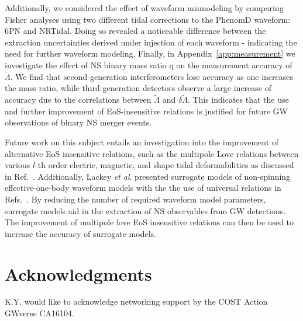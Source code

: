 \documentclass[prd,twocolumn,nofootinbib,superscriptaddress,amsmath,amssymb]{revtex4-1}
\begin{document}
Additionally, we considered the effect of waveform mismodeling by comparing Fisher analyses using two different tidal corrections to the PhenomD waveform: 6PN and NRTidal.
Doing so revealed a noticeable difference between the extraction uncertainties derived under injection of each waveform - indicating the need for further waveform modeling.
Finally, in Appendix~\ref{app:measurement} we investigate the effect of NS binary mass ratio q on the measurement accuracy of $\tilde\Lambda$.
We find that second generation interferometers lose accuracy as one increases the mass ratio, while third generation detectors observe a large increase of accuracy due to the correlations between $\tilde\Lambda$ and $\delta\tilde\Lambda$.
This indicates that the use and further improvement of EoS-insensitive relations is justified for future GW observations of binary NS merger events.

Future work on this subject entails an investigation into the improvement of alternative EoS insensitive relations, such as the multipole Love relations between various $l$-th order electric, magnetic, and shape tidal deformabilities as discussed in Ref.~\cite{Yagi:Multipole}.
Additionally, Lackey \emph{et al}. presented surrogate models of non-spinning effective-one-body waveform models with the the use of universal relations in Refs.~\cite{Lackey:Surrogate, Lackey:EOB}.
By reducing the number of required waveform model parameters, surrogate models aid in the extraction of NS observables from GW detections.
The improvement of multipole love EoS insensitive relations can then be used to increase the accuracy of surrogate models.

\section*{Acknowledgments}\label{acknowledgments}
K.Y. would like to acknowledge networking support by the COST Action GWverse CA16104.

\appendix
\end{document}
